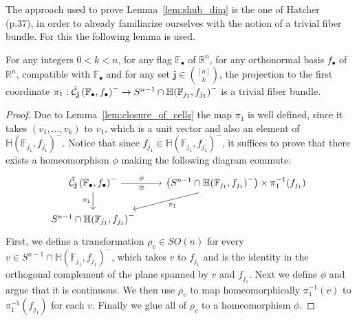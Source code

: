 The approach used to prove Lemma~\ref{lem:shub_dim} is the one of Hatcher~\cite{vec_bundles} (p.37), in order to already familiarize ourselves with the notion of a trivial fiber bundle. For this the following lemma is used.
\begin{lemma}\label{lem:trivial_fb} For any integers $0<k<n$, for any flag $\mathbb{F}_{\bullet}$ of $\mathbb{R}^n$, for any orthonormal basis $f_{\bullet}$ of $\mathbb{R}^n$, compatible with $\mathbb{F}_{\bullet}$ and for any set $\mathbf{j}\in\binom{[n]}{k}$, the projection to the first coordinate
$\pi_1:\tilde{\mathcal{C}}_{\mathbf{j}}\left(\mathbb{F}_{\bullet},f_{\bullet}\right)^-\to S^{n-1}\cap\mathbb{H}{\left(\mathbb{F}_{j_1},f_{j_1}\right)}^-$
is a trivial fiber bundle.
\end{lemma}
\begin{proof} Due to Lemma~\ref{lem:closure_of_cells} the map $\pi_1$ is well defined, since it takes $(v_1,\ldots,v_k)$ to $v_1$, which is a unit vector and also an element of $\mathbb{H}{\left(\mathbb{F}_{j_1},f_{j_1}\right)}^-$. Notice that since $f_{j_1}\in\mathbb{H}{\left(\mathbb{F}_{j_1},f_{j_1}\right)}^-$, it suffices to prove that there exists a homeomorphism $\phi$ making the following diagram commute:
\begin{equation}\label{eq:phi_for_trivial}
\begin{tikzcd}
\stcell{j}^-\ar[r,"\phi","\cong"']\ar[d,"\pi_1"']&\big(S^{n-1}\cap\mathbb{H}{\left(\mathbb{F}_{j_1},f_{j_1}\right)}^-\big)\times\pi_1^{-1}(f_{j_1})\ar[dl,"\pi_1"]\\
S^{n-1}\cap\mathbb{H}{\left(\mathbb{F}_{j_1},f_{j_1}\right)}^-
\end{tikzcd}
\end{equation}
First, we define a transformation $\rho_{v}\in SO(n)$ for every $v\in S^{n-1}\cap\mathbb{H}{\left(\mathbb{F}_{j_1},f_{j_1}\right)}^-$, which takes $v$ to $f_{j_1}$ and is the identity in the orthogonal complement of the plane spanned by $v$ and $f_{j_1}$. Next we define $\phi$ and argue that it is continuous. We then use $\rho_{v}$ to map homeomorphically $\pi_1^{-1}(v)$ to $\pi_1^{-1}(f_{j_1})$ for each $v$. Finally we glue all of $\rho_v$ to a homeomorphism $\phi$.


\end{proof}
